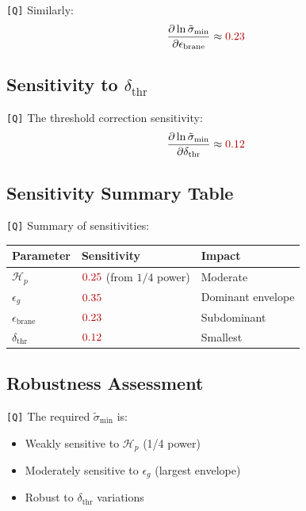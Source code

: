 \documentclass[11pt,a4paper]{article}
\newcommand{\Qval}[1]{\textcolor{red!70!black}{#1}}
\newcommand{\tagQ}{\textcolor{red!70!black}{\texttt{[Q]}}}
\theoremstyle{definition}
\begin{document}
\tagQ{} Similarly:
\begin{equation}
\label{eq:sens-eps-brane-formula}
\frac{\partial \ln\tilde{\sigma}_{\min}}{\partial \epsilon_{\text{brane}}} \approx \Qval{0.23}
\end{equation}

\subsection{Sensitivity to $\delta_{\text{thr}}$}
\label{app:sens-delta}

\tagQ{} The threshold correction sensitivity:
\begin{equation}
\label{eq:sens-delta-formula}
\frac{\partial \ln\tilde{\sigma}_{\min}}{\partial \delta_{\text{thr}}} \approx \Qval{0.12}
\end{equation}

\subsection{Sensitivity Summary Table}
\label{app:sens-summary}

\tagQ{} Summary of sensitivities:

\begin{center}
\begin{tabular}{lll}
\toprule
Parameter & Sensitivity & Impact \\
\midrule
$\mathcal{H}_p$ & $\Qval{0.25}$ (from $1/4$ power) & Moderate \\
$\epsilon_g$ & $\Qval{0.35}$ & Dominant envelope \\
$\epsilon_{\text{brane}}$ & $\Qval{0.23}$ & Subdominant \\
$\delta_{\text{thr}}$ & $\Qval{0.12}$ & Smallest \\
\bottomrule
\end{tabular}
\end{center}

\subsection{Robustness Assessment}
\label{app:robust}

\tagQ{} The required $\tilde{\sigma}_{\min}$ is:
\begin{itemize}
  \item Weakly sensitive to $\mathcal{H}_p$ (1/4 power)
  \item Moderately sensitive to $\epsilon_g$ (largest envelope)
  \item Robust to $\delta_{\text{thr}}$ variations
\end{itemize}
\end{document}
